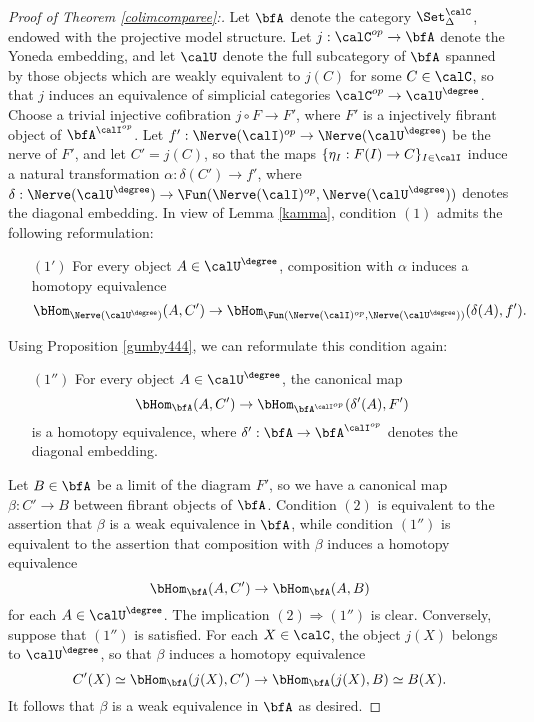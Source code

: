 \begin{proof}[Proof of Theorem \ref{colimcomparee}:]
Let $\bfA$ denote the category $\Set_{\Delta}^{\calC}$, endowed with the projective
model structure. Let $j: \calC^{op} \rightarrow \bfA$ denote the Yoneda embedding, and let $\calU$ denote the full subcategory of $\bfA$ spanned by those objects which are weakly equivalent
to $j(C)$ for some $C \in \calC$, so that $j$ induces an equivalence of simplicial categories
$\calC^{op} \rightarrow \calU^{\degree}$. Choose a trivial injective cofibration
$j \circ F \rightarrow F'$, where $F'$ is a injectively fibrant object of $\bfA^{\calI^{op}}$. 
Let $f': \Nerve(\calI)^{op} \rightarrow \Nerve( \calU^{\degree} )$
be the nerve of $F'$, and let $C' = j(C)$, so that the maps 
$\{ \eta_{I}: F(I) \rightarrow C \}_{I \in \calI}$ induce a natural transformation $\alpha: \delta(C') \rightarrow f'$, where $\delta: \Nerve( \calU^{\degree}) \rightarrow \Fun( \Nerve(\calI)^{op}, \Nerve(\calU^{\degree}) )$ denotes the diagonal embedding. In view of Lemma \ref{kamma}, condition
$(1)$ admits the following reformulation:

\begin{itemize}
\item[$(1')$] For every object $A \in \calU^{\degree}$, composition with
$\alpha$ induces a homotopy equivalence 
$$ \bHom_{ \Nerve(\calU^{\degree}) }( A,C') \rightarrow \bHom_{ \Fun( \Nerve(\calI)^{op}, \Nerve(\calU^{\degree})) }( \delta(A),f' ).$$
\end{itemize}

Using Proposition \ref{gumby444}, we can reformulate this condition again:

\begin{itemize}
\item[$(1'')$] For every object $A \in \calU^{\degree}$, the canonical map
$$ \bHom_{ \bfA }( A,C') \rightarrow \bHom_{ \bfA^{ \calI^{op}}}( \delta'(A), F')$$
is a homotopy equivalence, where $\delta': \bfA \rightarrow \bfA^{\calI^{op}}$ denotes
the diagonal embedding. 
\end{itemize}

Let $B \in \bfA$ be a limit of the diagram $F'$, so we have a canonical map
$\beta: C' \rightarrow B$ between fibrant objects of $\bfA$. Condition $(2)$ is
equivalent to the assertion that $\beta$ is a weak equivalence in $\bfA$, while
condition $(1'')$ is equivalent to the assertion that composition with
$\beta$ induces a homotopy equivalence
$$ \bHom_{\bfA}(A, C') \rightarrow \bHom_{\bfA}(A, B)$$
for each $A \in \calU^{\degree}$. The implication $(2) \Rightarrow (1'')$ is clear.
Conversely, suppose that $(1'')$ is satisfied. For each $X \in \calC$, the
object $j(X)$ belongs to $\calU^{\degree}$, so that $\beta$ induces a
homotopy equivalence
$$ C'(X) \simeq \bHom_{\bfA}( j(X), C') \rightarrow \bHom_{\bfA}( j(X), B)
\simeq B(X).$$
It follows that $\beta$ is a weak equivalence in $\bfA$ as desired.
\end{proof}

